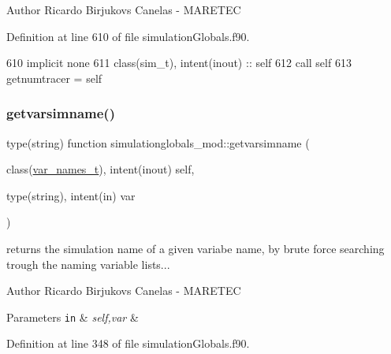 \begin{DoxyAuthor}{Author}
Ricardo Birjukovs Canelas -\/ M\+A\+R\+E\+T\+EC 
\end{DoxyAuthor}


Definition at line 610 of file simulation\+Globals.\+f90.


\begin{DoxyCode}
610     \textcolor{keywordtype}{implicit none}
611     \textcolor{keywordtype}{class}(sim\_t), \textcolor{keywordtype}{intent(inout)} :: self
612     \textcolor{keyword}{call }self%
613     getnumtracer = self%
\end{DoxyCode}
\mbox{\label{namespacesimulationglobals__mod_ac83c53dd4e998e653981c7b1fa5dacbd}} 
\subsubsection{\texorpdfstring{getvarsimname()}{getvarsimname()}}
{\footnotesize\ttfamily type(string) function simulationglobals\+\_\+mod\+::getvarsimname (\begin{DoxyParamCaption}\item[{class(\mbox{\hyperlink{structsimulationglobals__mod_1_1var__names__t}{var\+\_\+names\+\_\+t}}), intent(inout)}]{self,  }\item[{type(string), intent(in)}]{var }\end{DoxyParamCaption})\hspace{0.3cm}{\ttfamily [private]}}



returns the simulation name of a given variabe name, by brute force searching trough the naming variable lists... 

\begin{DoxyAuthor}{Author}
Ricardo Birjukovs Canelas -\/ M\+A\+R\+E\+T\+EC 
\end{DoxyAuthor}

\begin{DoxyParams}[1]{Parameters}
\mbox{\tt in}  & {\em self,var} & \\
\hline
\end{DoxyParams}


Definition at line 348 of file simulation\+Globals.\+f90.


